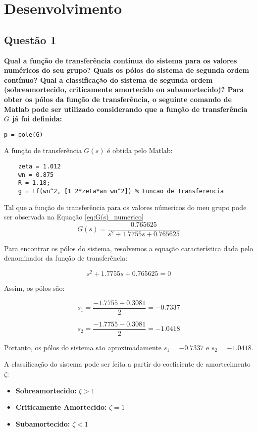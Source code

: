 \section{Desenvolvimento}

\subsection{Questão 1}
\textbf{Qual a função de transferência contínua do sistema para os valores numéricos do seu grupo? Quais os pólos do sistema de segunda ordem contínuo? Qual a classificação do sistema de segunda ordem (sobreamortecido, criticamente amortecido ou subamortecido)? Para obter os pólos da função de transferência, o seguinte comando de Matlab pode ser utilizado considerando que a função de transferência \( G \) já foi definida:}
\begin{verbatim}
p = pole(G)
\end{verbatim}

A função de transferência \( G(s) \) é obtida pelo Matlab:

\begin{verbatim}
    zeta = 1.012
    wn = 0.875
    R = 1.18;
    g = tf(wn^2, [1 2*zeta*wn wn^2]) % Funcao de Transferencia
\end{verbatim}

Tal que a função de transferência para os valores númericos do meu grupo pode ser observada na Equação \ref{eq:G(s)_numerico}
\begin{equation}
\label{eq:G(s)_numerico}
   G(s) = \frac{0.765625}{s^2 + 1.7755s + 0.765625}
\end{equation}

   Para encontrar os pólos do sistema, resolvemos a equação característica dada pelo denominador da função de transferência:

   \[
   s^2 + 1.7755s + 0.765625 = 0
   \]

   Assim, os pólos são:

   \[
   s_1 = \frac{-1.7755 + 0.3081}{2} = -0.7337
   \]

   \[
   s_2 = \frac{-1.7755 - 0.3081}{2} = -1.0418
   \]

   Portanto, os pólos do sistema são aproximadamente \( s_1 = -0.7337 \) e \( s_2 = -1.0418 \).

   A classificação do sistema pode ser feita a partir do coeficiente de amortecimento \( \zeta \):

\begin{itemize}
    \item \textbf{Sobreamortecido:} \( \zeta > 1 \)
    \item \textbf{Criticamente Amortecido:} \( \zeta = 1 \)
    \item \textbf{Subamortecido:} \( \zeta < 1 \)
\end{itemize}

